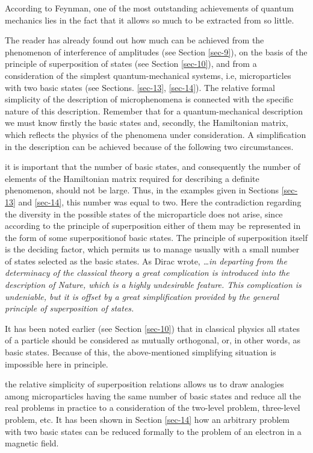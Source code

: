 \documentclass[a4paper,sfsidenotes,colorlinks=true]{tufte-book}
\numberwithin{equation}{section}
\numberwithin{figure}{section}
\begin{document}
According to Feynman, one of the most outstanding achievements of
quantum mechanics lies in the fact that it allows so much to be
extracted from so little.


The reader has already found out how much can be achieved from the
phenomenon of interference of amplitudes (see Section \ref{sec-9}), on
the basis of the principle of superposition of states (see Section
\ref{sec-10}), and from a consideration of the simplest
quantum-mechanical systems, i.e, microparticles with two basic states
(see Sections. \ref{sec-13}, \ref{sec-14}). The relative formal
simplicity of the description of microphenomena is connected with the
specific nature of this description. Remember that for a
quantum-mechanical description we must know firstly the basic states
and, secondly, the Hamiltonian matrix, which reflects the physics of
the phenomena under consideration. A simplification in the description
can be achieved because of the following two circumstances.

\begin{description}[leftmargin=1cm]
\item[Firstly,] it is important that the number of basic states, and
  consequently the number of elements of the Hamiltonian matrix
  required for describing a definite phenomenon, should not be
  large. Thus, in the examples given in Sections \ref{sec-13} and
  \ref{sec-14}, this number was equal to two. Here the contradiction
  regarding the diversity in the possible states of the microparticle
  does not arise, since according to the principle of superposition
  either of them may be represented in the form of some
  superpositionof basic states. The principle of superposition itself
  is the deciding factor, which permits us to manage usually with a
  small number of states selected as the basic states. As Dirac
  wrote, \emph{\ldots in departing from the determinacy of the classical
  theory a great complication is introduced into the description of
  Nature, which is a highly undesirable feature. This complication is
  undeniable, but it is offset by a great simplification provided by
  the general principle of superposition of states.}\cite{dirac-1958}


It has been noted earlier (see Section \ref{sec-10}) that in classical
physics all states of a particle should be considered as mutually
orthogonal, or, in other words, as basic states. Because of this, the
above-mentioned simplifying situation is impossible here in principle.


\item[Secondly,] the relative simplicity of superposition relations
  allows us to draw analogies among microparticles having the same
  number of basic states and reduce all the real problems in practice
  to a consideration of the two-level problem, three-level problem,
  etc. It has been shown in Section \ref{sec-14} how an arbitrary
  problem with two basic states can be reduced formally to the problem
  of an electron in a magnetic field.
\end{description}
\end{document}
